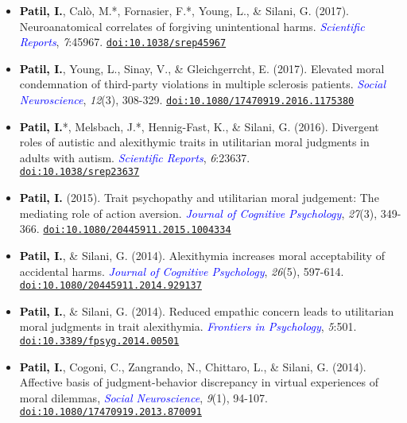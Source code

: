 \documentclass[10pt]{article}
\begin{document}
\begin{itemize}
	\item \textbf{\textcolor{black}{Patil, I.}}, Cal\`{o}, M.*, Fornasier, F.*, Young, L., \& Silani, G. (2017). Neuroanatomical correlates of forgiving unintentional harms. \textit{\textcolor{blue}{Scientific Reports}}, \textit{7}:45967. \href{https://drive.google.com/open?id=0B6_u70YpdJKnRV81UnNlZHdrdXM}{\tt doi:10.1038/srep45967}
	
	\item \textbf{\textcolor{black}{Patil, I.}}, Young, L., Sinay, V., \& Gleichgerrcht, E. (2017). Elevated moral condemnation of third-party violations in multiple sclerosis patients. \textit{\textcolor{blue}{Social Neuroscience}}, \textit{12}(3), 308-329. \href{https://drive.google.com/open?id=0B6_u70YpdJKnT3M0bWpPdDY4RHc}{\tt doi:10.1080/17470919.2016.1175380}
	
	\item \textbf{\textcolor{black}{Patil, I.}}*, Melsbach, J.*, Hennig-Fast, K., \& Silani, G. (2016). Divergent roles of autistic and alexithymic traits in utilitarian moral judgments in adults with autism. \textit{\textcolor{blue}{Scientific Reports}}, \textit{6}:23637.\\
	\href{https://drive.google.com/file/d/0B6_u70YpdJKnV1p2UmNwa09iS1k/view?usp=sharing}{\tt doi:10.1038/srep23637}
	
	\item \textbf{\textcolor{black}{Patil, I.}} (2015). Trait psychopathy and utilitarian moral judgement: The mediating role of action aversion. \textit{\textcolor{blue}{Journal of Cognitive Psychology}}, \textit{27}(3), 349-366. \href{https://drive.google.com/file/d/0B6_u70YpdJKnQjVJUFgtR2ZmWTVqZGxRMEFfemVIOUVuME5Z/view?usp=sharing}{\tt doi:10.1080/20445911.2015.1004334}
	
	\item \textbf{\textcolor{black}{Patil, I.}}, \& Silani, G. (2014). Alexithymia increases moral acceptability of accidental harms. \textit{\textcolor{blue}{Journal of Cognitive Psychology}}, \textit{26}(5), 597-614. \href{https://drive.google.com/file/d/0B6_u70YpdJKnMU5pVHRUM3p0SFk/view?usp=sharing}{\tt doi:10.1080/20445911.2014.929137}
	
	\item \textbf{\textcolor{black}{Patil, I.}}, \& Silani, G. (2014). Reduced empathic concern leads to utilitarian moral judgments in trait alexithymia. \textit{\textcolor{blue}{Frontiers in Psychology}}, \textit{5}:501. \href{https://drive.google.com/file/d/0B6_u70YpdJKnUkJZR252dXBwcVk/view?usp=sharing}{\tt doi:10.3389/fpsyg.2014.00501}
	
	\item \textbf{\textcolor{black}{Patil, I.}}, Cogoni, C., Zangrando, N., Chittaro, L., \& Silani, G. (2014). {Affective basis of judgment-behavior discrepancy in virtual experiences of moral dilemmas}, \textit{\textcolor{blue}{Social Neuroscience}}, \textit{9}(1), 94-107. \\
	\href{https://drive.google.com/file/d/0B6_u70YpdJKnV3RIR2s2cWlFdVU/view?usp=sharing}{\tt doi:10.1080/17470919.2013.870091}
	
	\end{itemize}
	
\end{document}
